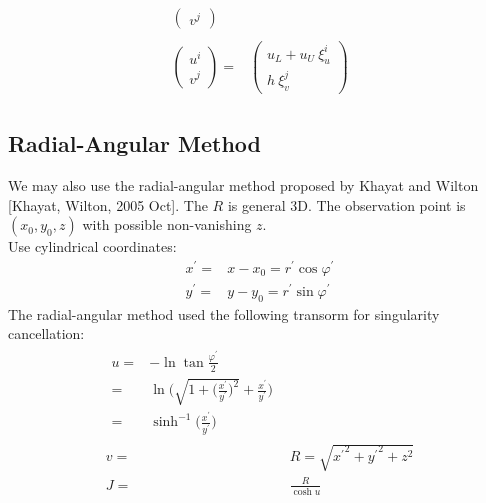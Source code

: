 \documentclass [10pt,letterpaper]{article}
\begin{document}
\begin{subequations}
\begin{align}
\begin{split}
\begin{pmatrix}
				v^j
			\end{pmatrix}
		\end{split}
		\\
		\begin{split} 
			\begin{pmatrix}
				u^i					\\
				v^j
			\end{pmatrix}
			=&
			\begin{pmatrix}
				u_L
				+ 
				u_U
				\ \xi_u^i				\\
				h
				\ \xi_v^j
			\end{pmatrix}
		\end{split}
	\end{align}
\end{subequations}
\subsection{Radial-Angular Method}
\label{sub:radial-angular-method}
We may also use the radial-angular method proposed by Khayat and Wilton [Khayat, Wilton, 2005 Oct].
The $R$ is general 3D.
The observation point is $(x_0,y_0,z)$ with possible non-vanishing $z$.
\\
Use cylindrical coordinates:
\begin{subequations} \label{eq:def-radial-angular-method-xp-yp-rp-varphip}
	\begin{align} 
		x^{\prime} =& x-x_0 = r^{\prime} \cos{\varphi^{\prime}}	\\
		y^{\prime} =& y-y_0 = r^{\prime} \sin{\varphi^{\prime}}
	\end{align}
\end{subequations}
The radial-angular method used the following transorm for singularity cancellation:
\begin{subequations} \label{eq:def-radial-angular-method-u-v-J}
	\begin{align}
		\begin{split} 
			u 
			=&
				-
				\ln{\tan{\frac{\varphi^{\prime}}{2}}}
			\\
			=&
				\ln\bigg(
					\sqrt{ 1 + \bigg(
						\frac{x^{\prime}}{y^{\prime}} \bigg)^2 }
					+
					\frac{x^{\prime}}{y^{\prime}}
				\bigg) 
			\\
			=&
				\sinh^{-1} \bigg(
					\frac{x^{\prime}}{y^{\prime}}
				\bigg)
		\end{split}
		\\
		v
		=&
			R
			= 
			\sqrt{ {x^{\prime}}^2 + {y^{\prime}}^2 + z^2 }	
		\\
		J
		=&
			\frac{R}{\cosh{u}}
	\end{align}
\end{subequations}
\end{document}
